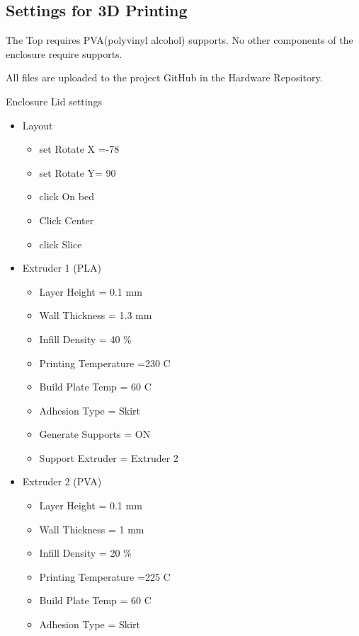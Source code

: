 \subsection{Settings for 3D Printing}
The Top requires PVA(polyvinyl alcohol) supports.
No other components of the enclosure require supports.

All files are uploaded to the project GitHub in the Hardware Repository.

\begin{subsubsec}{Enclosure Lid settings}
\begin{itemize}
    \item Layout 
    \begin{itemize}
        \item set Rotate X =-78
        \item set Rotate Y= 90
        \item click On bed
        \item Click Center
        \item click Slice
    \end{itemize}
    
    \item Extruder 1 (PLA)
    \begin{itemize}
        \item Layer Height = 0.1 mm
        \item Wall Thickness = 1.3 mm
        \item Infill Density = 40 \%
        \item Printing Temperature =230 C
        \item Build Plate Temp = 60 C
        \item Adhesion Type = Skirt
        \item Generate Supports = ON
        \item Support Extruder = Extruder 2
    \end{itemize}

    \item Extruder 2 (PVA)
    \begin{itemize}
        \item Layer Height = 0.1 mm
        \item Wall Thickness = 1 mm
        \item Infill Density = 20 \%
        \item Printing Temperature =225 C
        \item Build Plate Temp = 60 C
        \item Adhesion Type = Skirt
    \end{itemize}


\end{itemize}
\end{subsubsec}
